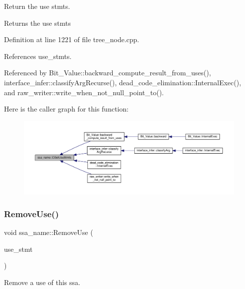 Return the use stmts. 

\begin{DoxyReturn}{Returns}
the use stmts 
\end{DoxyReturn}


Definition at line 1221 of file tree\+\_\+node.\+cpp.



References use\+\_\+stmts.



Referenced by Bit\+\_\+\+Value\+::backward\+\_\+compute\+\_\+result\+\_\+from\+\_\+uses(), interface\+\_\+infer\+::classify\+Arg\+Recurse(), dead\+\_\+code\+\_\+elimination\+::\+Internal\+Exec(), and raw\+\_\+writer\+::write\+\_\+when\+\_\+not\+\_\+null\+\_\+point\+\_\+to().

Here is the caller graph for this function\+:
\nopagebreak
\begin{figure}[H]
\begin{center}
\leavevmode
\includegraphics[width=350pt]{db/d2f/structssa__name_acdb4743f93ac497cce42a54359785b00_icgraph}
\end{center}
\end{figure}
\mbox{\label{structssa__name_a7868a4cb68f715b32df67f1217865470}} 
\subsubsection{\texorpdfstring{Remove\+Use()}{RemoveUse()}}
{\footnotesize\ttfamily void ssa\+\_\+name\+::\+Remove\+Use (\begin{DoxyParamCaption}\item[{const \hyperlink{tree__node_8hpp_a6ee377554d1c4871ad66a337eaa67fd5}{tree\+\_\+node\+Ref} \&}]{use\+\_\+stmt }\end{DoxyParamCaption})}



Remove a use of this ssa. 


